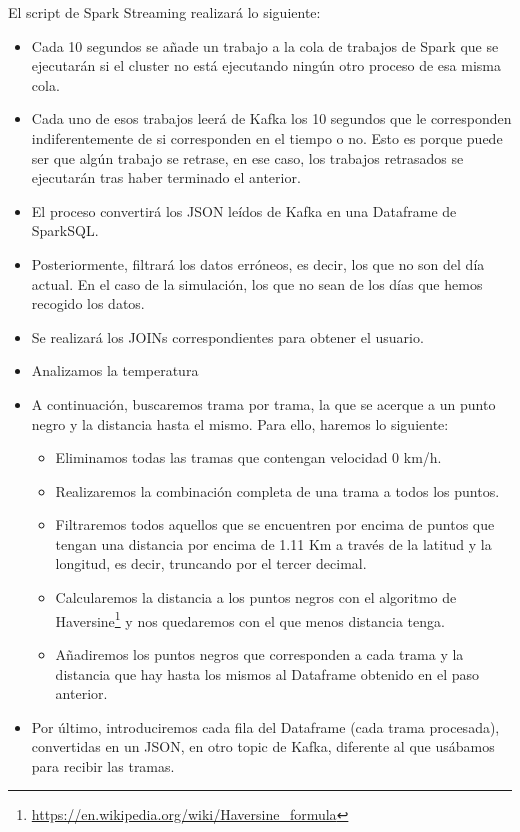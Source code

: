 El script de Spark Streaming realizará lo siguiente:

\begin{itemize}
        \item Cada 10 segundos se añade un trabajo a la cola de trabajos de Spark que se ejecutarán si el cluster no está ejecutando ningún otro proceso de esa misma cola.
        \item Cada uno de esos trabajos leerá de Kafka los 10 segundos que le corresponden indiferentemente de si corresponden en el tiempo o no. Esto es porque puede ser que algún trabajo se retrase, en ese caso, los trabajos retrasados se ejecutarán tras haber terminado el anterior.
        \item El proceso convertirá los JSON leídos de Kafka en una Dataframe de SparkSQL.
        \item Posteriormente, filtrará los datos erróneos, es decir, los que no son del día actual. En el caso de la simulación, los que no sean de los días que hemos recogido los datos.
        \item Se realizará los JOINs correspondientes para obtener el usuario.
        \item Analizamos la temperatura
        \item A continuación, buscaremos trama por trama, la que se acerque a un punto negro y la distancia hasta el mismo. Para ello, haremos lo siguiente:
        \begin{itemize}
                \item Eliminamos todas las tramas que contengan velocidad 0 km/h.
                \item Realizaremos la combinación completa de una trama a todos los puntos.
                \item Filtraremos todos aquellos que se encuentren por encima de puntos que tengan una distancia por encima de 1.11 Km a través de la latitud y la longitud, es decir, truncando por el tercer decimal.
                \item Calcularemos la distancia a los puntos negros con el algoritmo de Haversine\footnote{\url{https://en.wikipedia.org/wiki/Haversine_formula}} y nos quedaremos con el que menos distancia tenga.
                \item Añadiremos los puntos negros que corresponden a cada trama y la distancia que hay hasta los mismos al Dataframe obtenido en el paso anterior.
        \end{itemize}
        \item Por último, introduciremos cada fila del Dataframe (cada trama procesada), convertidas en un JSON, en otro topic de Kafka, diferente al que usábamos para recibir las tramas.
\end{itemize}


